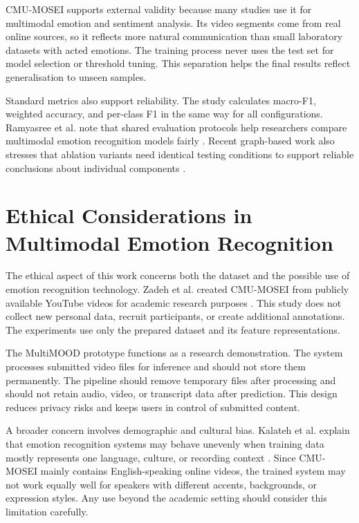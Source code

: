 CMU-MOSEI supports external validity because many studies use it for multimodal emotion and sentiment analysis. Its video segments come from real online sources, so it reflects more natural communication than small laboratory datasets with acted emotions. The training process never uses the test set for model selection or threshold tuning. This separation helps the final results reflect generalisation to unseen samples.

Standard metrics also support reliability. The study calculates macro-F1, weighted accuracy, and per-class F1 in the same way for all configurations. Ramyasree et al. note that shared evaluation protocols help researchers compare multimodal emotion recognition models fairly \cite{ramyasree2025emotion}. Recent graph-based work also stresses that ablation variants need identical testing conditions to support reliable conclusions about individual components \cite{khan2026context}.

\section{Ethical Considerations in Multimodal Emotion Recognition}
\label{sec:ethics}

The ethical aspect of this work concerns both the dataset and the possible use of emotion recognition technology. Zadeh et al. created CMU-MOSEI from publicly available YouTube videos for academic research purposes \cite{zadeh2018multimodal}. This study does not collect new personal data, recruit participants, or create additional annotations. The experiments use only the prepared dataset and its feature representations.

The MultiMOOD prototype functions as a research demonstration. The system processes submitted video files for inference and should not store them permanently. The pipeline should remove temporary files after processing and should not retain audio, video, or transcript data after prediction. This design reduces privacy risks and keeps users in control of submitted content.

A broader concern involves demographic and cultural bias. Kalateh et al. explain that emotion recognition systems may behave unevenly when training data mostly represents one language, culture, or recording context \cite{kalateh2024systematic}. Since CMU-MOSEI mainly contains English-speaking online videos, the trained system may not work equally well for speakers with different accents, backgrounds, or expression styles. Any use beyond the academic setting should consider this limitation carefully.

